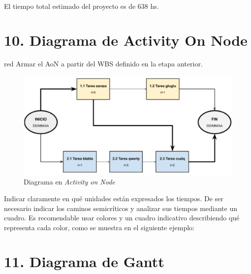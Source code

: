 \documentclass[
11pt, %
]{charter}
\begin{document}
El tiempo total estimado del proyecto es de 638 hs.


\section{10. Diagrama de Activity On Node}
\label{sec:AoN}

\begin{consigna}{red}
Armar el AoN a partir del WBS definido en la etapa anterior. 



\end{consigna}

\begin{figure}[htpb]
\centering 
\includegraphics[width=.8\textwidth]{./Figuras/AoN.png}
\caption{Diagrama en \textit{Activity on Node}}
\label{fig:AoN}
\end{figure}

Indicar claramente en qué unidades están expresados los tiempos.
De ser necesario indicar los caminos semicríticos y analizar sus tiempos mediante un cuadro.
Es recomendable usar colores y un cuadro indicativo describiendo qué representa cada color, como se muestra en el siguiente ejemplo:



\section{11. Diagrama de Gantt}
\label{sec:gantt}
\end{document}
